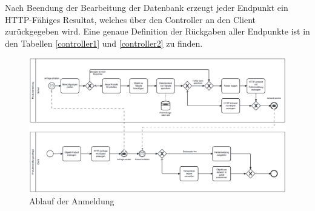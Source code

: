 Nach Beendung der Bearbeitung der Datenbank erzeugt jeder Endpunkt ein HTTP-Fähiges Resultat, welches über den Controller an den Client zurückgegeben wird.
Eine genaue Definition der Rückgaben aller Endpunkte ist in den Tabellen \vref{controller1} und \vref{controller2} zu finden.
 
\begin{figure}
	\centering
	\includegraphics[width=1\linewidth]{Produkterstellung.png}
	\caption{Ablauf der Anmeldung}
	\label{product-creation}
\end{figure}
